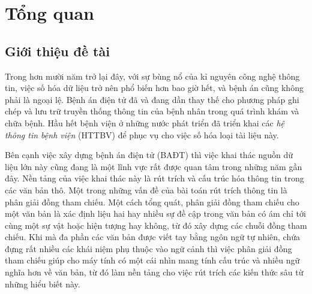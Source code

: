 \chapter{Tổng quan}
\section{Giới thiệu đề tài\label{gioithieudetai}}
Trong hơn mười năm trở lại đây, với sự bùng nổ của kỉ nguyên công nghệ thông tin, việc số hóa dữ liệu trở nên phổ biến hơn bao giờ hết, và bệnh án cũng không phải là ngoại lệ. Bệnh án điện tử đã và đang dần thay thế cho phương pháp ghi chép và lưu trữ truyền thống thông tin của bệnh nhân trong quá trình khám và chữa bệnh. Hầu hết bệnh viện ở những nước phát triển đã triển khai các \emph{hệ thông tin bệnh viện} (HTTBV) để phục vụ cho việc số hóa loại tài liệu này.


Bên cạnh việc xây dựng bệnh án điện tử (BAĐT) thì việc khai thác nguồn dữ liệu lớn
này cũng đang là một lĩnh vực rất được quan tâm trong những năm gần đây. Nền tảng của việc khai thác này là rút trích và cấu trúc hóa thông tin trong các văn bản thô. Một trong những vấn đề của bài toán rút trích thông tin là phân giải đồng tham chiếu. Một cách tổng quát, phân giải đồng tham chiếu cho một văn bản là xác định liệu hai hay nhiều sự đề cập trong văn bản có ám chỉ tới cùng một sự vật hoặc hiện tượng hay không, từ đó xây dựng các chuỗi đồng tham chiếu. Khi mà đa phần các văn bản được viết tay bằng ngôn ngữ tự nhiên, chứa đựng rất nhiều các khái niệm phụ thuộc vào ngữ cảnh thì việc phân giải đồng tham chiếu giúp cho máy tính có một cái nhìn mang tính cấu trúc và nhiều ngữ nghĩa hơn về văn bản, từ đó làm nền tảng cho việc rút trích các kiến thức sâu từ những hiểu biết này.

